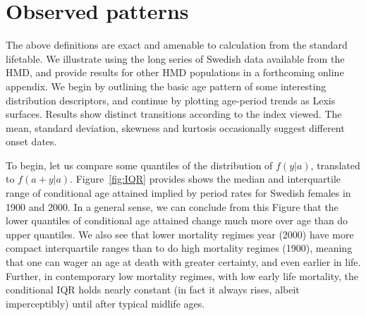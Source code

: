 \documentclass{article}
\begin{document}


\section*{Observed patterns}
The above definitions are exact and amenable to calculation from
the standard lifetable. We illustrate using the long series of Swedish data
available from the HMD, and provide results for other HMD populations in a
forthcoming online appendix. We begin by outlining the basic age pattern of
some interesting distribution descriptors, and continue by plotting
age-period trends as Lexis surfaces. Results show distinct transitions
according to the index viewed. The mean, standard deviation, skewness and
kurtosis occasionally suggest different onset dates. 

To
begin, let us compare some quantiles of the distribution of $f(y|a)$, translated to $f(a+y|a)$. Figure~\ref{fig:IQR} provides shows the median and interquartile range of conditional age attained implied by period rates for Swedish females in 1900 and 2000. In a general sense, we can conclude from this Figure that the lower quantiles of conditional age attained change much more over age than do upper quantiles. We also see that lower mortality regimes year (2000) have more
compact interquartile ranges than to do high mortality regimes (1900), meaning
that one can wager an age at death with greater certainty, and even earlier in
life.
Further, in contemporary low mortality regimes, with low early life mortality, the
conditional IQR holds nearly constant (in fact it always rises, albeit
imperceptibly) until after typical midlife ages.
\end{document}

